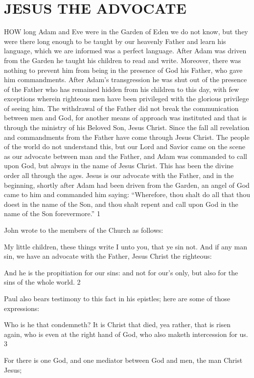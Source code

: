 \chapter{JESUS THE ADVOCATE}
HOW long Adam and Eve were in the Garden of Eden we do not know, but they were there
long enough to be taught by our heavenly Father and learn his language, which we are
informed was a perfect language. After Adam was driven from the Garden he taught his
children to read and write. Moreover, there was nothing to prevent him from being in the
presence of God his Father, who gave him commandments. After Adam's transgression he
was shut out of the presence of the Father who has remained hidden from his children to this
day, with few exceptions wherein righteous men have been privileged with the glorious
privilege of seeing him. The withdrawal of the Father did not break the communication
between men and God, for another means of approach was instituted and that is through the
ministry of his Beloved Son, Jesus Christ. Since the fall all revelation and commandments
from the Father have come through Jesus Christ. The people of the world do not understand
this, but our Lord and Savior came on the scene as our advocate between man and the Father,
and Adam was commanded to call upon God, but always in the name of Jesus Christ. This
has been the divine order all through the ages. Jesus is our advocate with the Father, and in
the beginning, shortly after Adam had been driven from the Garden, an angel of God came to
him and commanded him saying: ``Wherefore, thou shalt do all that thou doest in the name of
the Son, and thou shalt repent and call upon God in the name of the Son forevermore.'' 1

John wrote to the members of the Church as follows:

My little children, these things write I unto you, that ye sin not. And if any man sin, we have
an advocate with the Father, Jesus Christ the righteous:

And he is the propitiation for our sins: and not for our's only, but also for the sins of the
whole world. 2

Paul also bears testimony to this fact in his epistles; here are some of those expressions:

Who is he that condemneth? It is Christ that died, yea rather, that is risen again, who is even
at the right hand of God, who also maketh intercession for us. 3

For there is one God, and one mediator between God and men, the man Christ Jesus;

